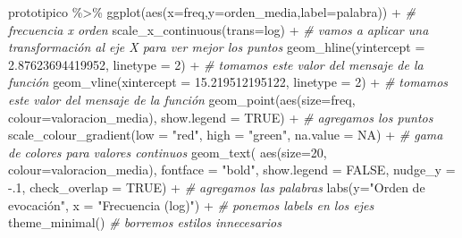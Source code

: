\documentclass[
]{book}
\newenvironment{Shaded}{\begin{snugshade}}{\end{snugshade}}
\newcommand{\AttributeTok}[1]{\textcolor[rgb]{0.77,0.63,0.00}{#1}}
\newcommand{\CommentTok}[1]{\textcolor[rgb]{0.56,0.35,0.01}{\textit{#1}}}
\newcommand{\ConstantTok}[1]{\textcolor[rgb]{0.00,0.00,0.00}{#1}}
\newcommand{\DecValTok}[1]{\textcolor[rgb]{0.00,0.00,0.81}{#1}}
\newcommand{\FloatTok}[1]{\textcolor[rgb]{0.00,0.00,0.81}{#1}}
\newcommand{\FunctionTok}[1]{\textcolor[rgb]{0.00,0.00,0.00}{#1}}
\newcommand{\NormalTok}[1]{#1}
\newcommand{\SpecialCharTok}[1]{\textcolor[rgb]{0.00,0.00,0.00}{#1}}
\newcommand{\StringTok}[1]{\textcolor[rgb]{0.31,0.60,0.02}{#1}}
\begin{document}
\begin{Shaded}
\begin{Highlighting}[]
\NormalTok{prototipico }\SpecialCharTok{\%\textgreater{}\%}
  \FunctionTok{ggplot}\NormalTok{(}\FunctionTok{aes}\NormalTok{(}\AttributeTok{x=}\NormalTok{freq,}\AttributeTok{y=}\NormalTok{orden\_media,}\AttributeTok{label=}\NormalTok{palabra)) }\SpecialCharTok{+} \CommentTok{\# frecuencia x orden}
  \FunctionTok{scale\_x\_continuous}\NormalTok{(}\AttributeTok{trans=}\StringTok{\textquotesingle{}log\textquotesingle{}}\NormalTok{) }\SpecialCharTok{+} \CommentTok{\# vamos a aplicar una transformación al eje X para ver mejor los puntos}
  \FunctionTok{geom\_hline}\NormalTok{(}\AttributeTok{yintercept =} \FloatTok{2.87623694419952}\NormalTok{, }\AttributeTok{linetype =} \DecValTok{2}\NormalTok{) }\SpecialCharTok{+} \CommentTok{\# tomamos este valor del mensaje de la función}
  \FunctionTok{geom\_vline}\NormalTok{(}\AttributeTok{xintercept =} \FloatTok{15.219512195122}\NormalTok{, }\AttributeTok{linetype =} \DecValTok{2}\NormalTok{) }\SpecialCharTok{+}  \CommentTok{\# tomamos este valor del mensaje de la función}
  \FunctionTok{geom\_point}\NormalTok{(}\FunctionTok{aes}\NormalTok{(}\AttributeTok{size=}\NormalTok{freq, }\AttributeTok{colour=}\NormalTok{valoracion\_media), }\AttributeTok{show.legend =} \ConstantTok{TRUE}\NormalTok{) }\SpecialCharTok{+} \CommentTok{\# agregamos los puntos}
  \FunctionTok{scale\_colour\_gradient}\NormalTok{(}\AttributeTok{low =} \StringTok{"red"}\NormalTok{, }\AttributeTok{high =} \StringTok{"green"}\NormalTok{, }\AttributeTok{na.value =} \ConstantTok{NA}\NormalTok{) }\SpecialCharTok{+} \CommentTok{\# gama de colores para valores continuos}
  \FunctionTok{geom\_text}\NormalTok{( }\FunctionTok{aes}\NormalTok{(}\AttributeTok{size=}\DecValTok{20}\NormalTok{, }\AttributeTok{colour=}\NormalTok{valoracion\_media), }\AttributeTok{fontface =} \StringTok{"bold"}\NormalTok{,}
             \AttributeTok{show.legend =} \ConstantTok{FALSE}\NormalTok{, }\AttributeTok{nudge\_y =} \SpecialCharTok{{-}}\NormalTok{.}\DecValTok{1}\NormalTok{, }\AttributeTok{check\_overlap =} \ConstantTok{TRUE}\NormalTok{) }\SpecialCharTok{+} \CommentTok{\# agregamos las palabras}
  \FunctionTok{labs}\NormalTok{(}\AttributeTok{y=}\StringTok{"Orden de evocación"}\NormalTok{, }\AttributeTok{x =} \StringTok{"Frecuencia (log)"}\NormalTok{) }\SpecialCharTok{+} \CommentTok{\# ponemos labels en los ejes}
  \FunctionTok{theme\_minimal}\NormalTok{() }\CommentTok{\# borremos estilos innecesarios}
\end{Highlighting}
\end{Shaded}
\end{document}
